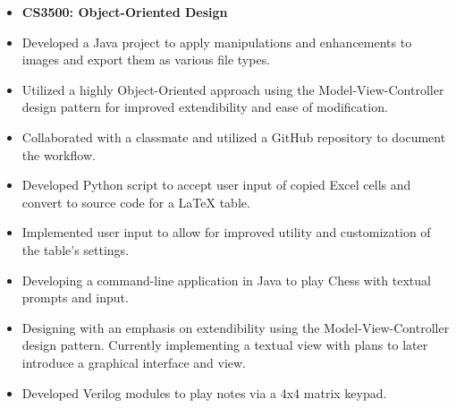 \documentclass[10pt,a4paper,ragged2e,withhyper]{altacv}
\begin{document}
\begin{paracol}{2}
    \vspace{-2em}
    \begin{itemize}
        \item[] \textbf{CS3500: Object-Oriented Design}
        \item Developed a Java project to apply manipulations and enhancements to images and export them as various file types.
        \item Utilized a highly Object-Oriented approach using the Model-View-Controller design pattern for improved extendibility and ease of modification.
        \item Collaborated with a classmate and utilized a GitHub repository to document the workflow.
    \end{itemize}

    \begin{itemize}
        \item Developed Python script to accept user input of copied Excel cells and convert to source code for a LaTeX table.
        \item Implemented user input to allow for improved utility and customization of the table's settings.
    \end{itemize}

    \begin{itemize}
        \item Developing a command-line application in Java to play Chess with textual prompts and input.
        \item Designing with an emphasis on extendibility using the Model-View-Controller design pattern. Currently implementing a textual view with plans to later introduce a graphical interface and view.
    \end{itemize}

    \begin{itemize}
        \item Developed Verilog modules to play notes via a 4x4 matrix keypad.
    \end{itemize}


\end{paracol}
\end{document}
